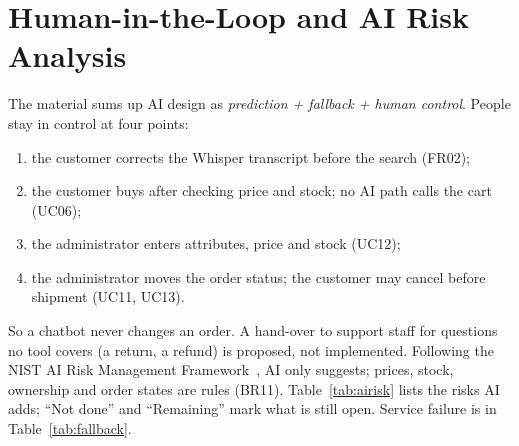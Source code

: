 \section{Human-in-the-Loop and AI Risk Analysis}\label{sec:hitl}

The material sums up AI design as \emph{prediction + fallback + human control}. People stay in control at four
points:
\begin{enumerate}
\item the customer corrects the Whisper transcript before the search (FR02);
\item the customer buys after checking price and stock; no AI path calls the cart (UC06);
\item the administrator enters attributes, price and stock (UC12);
\item the administrator moves the order status; the customer may cancel before shipment (UC11, UC13).
\end{enumerate}
So a chatbot never changes an order. A hand-over to support staff for questions no tool covers (a return, a refund) is
proposed, not implemented. Following the NIST AI Risk Management Framework~\cite{nistairmf}, AI only suggests; prices,
stock, ownership and order states are rules (BR11). Table~\ref{tab:airisk} lists the risks AI adds; ``Not done'' and
``Remaining'' mark what is still open. Service failure is in Table~\ref{tab:fallback}.

